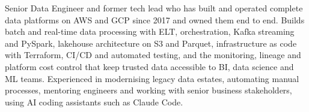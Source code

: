 
\begin{cvparagraph}

Senior Data Engineer and former tech lead who has built and operated complete data platforms on AWS and GCP since 2017 and owned them end to end. Builds batch and real-time data processing with ELT, orchestration, Kafka streaming and PySpark, lakehouse architecture on S3 and Parquet, infrastructure as code with Terraform, CI/CD and automated testing, and the monitoring, lineage and platform cost control that keep trusted data accessible to BI, data science and ML teams. Experienced in modernising legacy data estates, automating manual processes, mentoring engineers and working with senior business stakeholders, using AI coding assistants such as Claude Code.

\end{cvparagraph}
